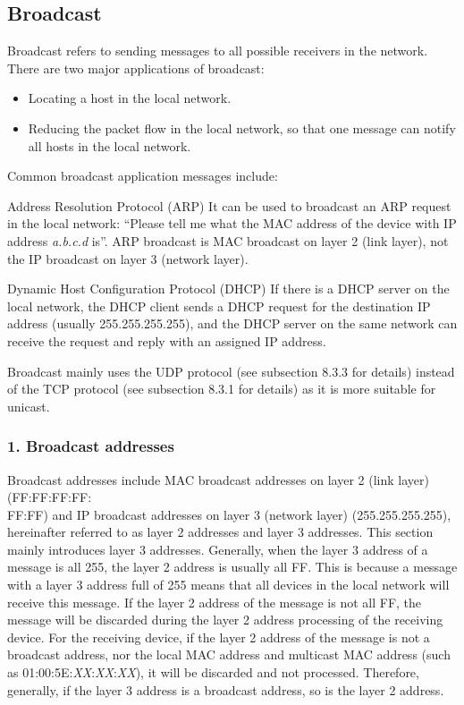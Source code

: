 \documentclass[a4paper,12pt]{book}
\begin{document}
\subsection{Broadcast}
Broadcast refers to sending messages to all possible receivers in the network. There are two major applications of broadcast:

\begin{itemize}[leftmargin=1.5em,noitemsep]
    \item Locating a host in the local network.
    \item Reducing the packet flow in the local network, so that one message can notify all hosts in the local network.
\end{itemize}

Common broadcast application messages include:

\begin{term}{Address Resolution Protocol (ARP)}
    It can be used to broadcast an ARP request in the local network: “Please tell me what the MAC address of the device with IP address \textit{a.b.c.d} is”. ARP broadcast is MAC broadcast on layer 2 (link layer), not the IP broadcast on layer 3 (network layer).
\end{term}

\begin{term}{Dynamic Host Configuration Protocol (DHCP)}
    If there is a DHCP server on the local network, the DHCP client sends a DHCP request for the destination IP address (usually 255.255.255.255), and the DHCP server on the same network can receive the request and reply with an assigned IP address.
\end{term}

Broadcast mainly uses the UDP protocol (see subsection 8.3.3 for details) instead of the TCP protocol (see subsection 8.3.1 for details) as it is more suitable for unicast.

\subsubsection{1. Broadcast addresses}
Broadcast addresses include MAC broadcast addresses on layer 2 (link layer) (FF:FF:FF:FF:\\FF:FF) and IP broadcast addresses on layer 3 (network layer) (255.255.255.255), hereinafter referred to as layer 2 addresses and layer 3 addresses. This section mainly introduces layer 3 addresses. Generally, when the layer 3 address of a message is all 255, the layer 2 address is usually all FF. This is because a message with a layer 3 address full of 255 means that all devices in the local network will receive this message. If the layer 2 address of the message is not all FF, the message will be discarded during the layer 2 address processing of the receiving device. For the receiving device, if the layer 2 address of the message is not a broadcast address, nor the local MAC address and multicast MAC address (such as 01:00:5E:\textit{XX}:\textit{XX}:\textit{XX}), it will be discarded and not processed. Therefore, generally, if the layer 3 address is a broadcast address, so is the layer 2 address.
\end{document}
